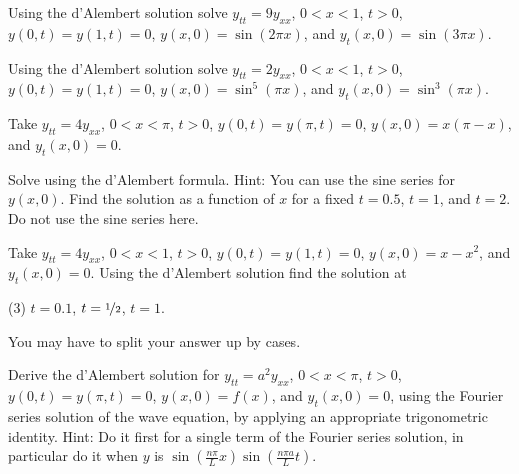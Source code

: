 \begin{exercise}\ansMark%
Using the d'Alembert solution solve $y_{tt} = 9y_{xx}$, $0 < x < 1$, $t >
0$,
$y(0,t) = y(1, t) = 0$, $y(x,0) = \sin (2 \pi x)$, and
$y_t(x,0) = \sin (3 \pi x)$.
\end{exercise}

\begin{exercise}
Using the d'Alembert solution solve $y_{tt} = 2y_{xx}$, $0 < x < 1$, $t > 0$,
$y(0,t) = y(1, t) = 0$, $y(x,0) = \sin^5 (\pi x)$, and
$y_t(x,0) = \sin^3 (\pi x)$.
\end{exercise}

\begin{exercise}
Take
$y_{tt} = 4y_{xx}$, $0 < x < \pi$, $t > 0$,
$y(0,t) = y(\pi, t) = 0$, $y(x,0) = x(\pi-x)$, and
$y_t(x,0) = 0$.
\begin{tasks}
\task Solve using the d'Alembert formula.  Hint: You can use the sine series
for $y(x,0)$.
\task Find the solution as a function of $x$ for a fixed $t=0.5$, $t=1$, and
$t=2$.  Do not use the sine series here.
\end{tasks}
\end{exercise}

\begin{exercise}\ansMark%
Take $y_{tt} = 4y_{xx}$, $0 < x < 1$, $t > 0$,
$y(0,t) = y(1, t) = 0$, $y(x,0) = x-x^2$, and
$y_t(x,0) = 0$.  Using the d'Alembert solution find
the solution at
\begin{tasks}(3)
\task $t=0.1$,
\task $t=\nicefrac{1}{2}$,
\task $t=1$.
\end{tasks}
You may have to split your answer up by cases.
\end{exercise}

\begin{exercise}
Derive the d'Alembert solution for $y_{tt} = a^2 y_{xx}$, $0 < x < \pi$, $t >
0$,
$y(0,t) = y(\pi, t) = 0$, $y(x,0) = f(x)$, and
$y_t(x,0) = 0$, using the Fourier series solution of the wave equation,
by applying an appropriate trigonometric identity.
Hint: Do it first for a single term of the Fourier series solution,
in particular do it when $y$ is
$\sin\left(\frac{n \pi}{L} x \right)\sin\left(\frac{n \pi a}{L} t \right)$.
\end{exercise}

